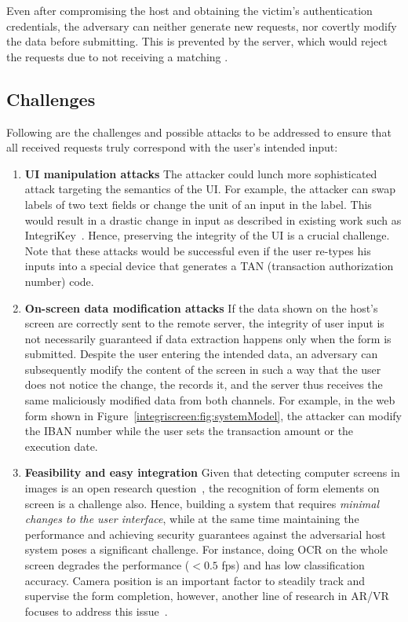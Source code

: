 Even after compromising the host and obtaining the victim's authentication credentials, the adversary can neither generate new requests, nor covertly modify the data before submitting. This is prevented by the server, which would reject the requests due to not receiving a matching \POI.


\subsection{Challenges}
\label{sec:systemDesign:challenger}

Following are the challenges and possible attacks to be addressed to ensure that all received requests truly correspond with the user's intended input:

\begin{enumerate}

\item \textbf{UI manipulation attacks}
The attacker could lunch more sophisticated attack targeting the semantics of the UI. For example, the attacker can swap labels of two text fields or change the unit of an input in the label. This would result in a drastic change in input as described in existing work such as IntegriKey~\cite{integrikey}. Hence, preserving the integrity of the UI is a crucial challenge. Note that these attacks would be successful even if the user re-types his inputs into a special device that generates a TAN (transaction authorization number) code.


\item \textbf{On-screen data modification attacks}
If the data shown on the host's screen are correctly sent to the remote server, the integrity of user input is not necessarily guaranteed if data extraction happens only when the form is submitted.
Despite the user entering the intended data, an adversary can subsequently modify the content of the screen in such a way that the user does not notice the change, the \app records it, and the server thus receives the same maliciously modified data from both channels. For example, in the web form shown in Figure~\ref{integriscreen:fig:systemModel}, the attacker can modify the IBAN number while the user sets the transaction amount or the execution date. 

 

\item \textbf{Feasibility and easy integration}
Given that detecting computer screens in images is an open research question~\cite{detectingScreens}, the recognition of form elements on screen is a challenge also. Hence, building a system that requires \emph{minimal changes to the user interface}, while at the same time maintaining the performance and achieving security guarantees against the adversarial host system poses a significant challenge. For instance, doing OCR on the whole screen degrades the performance ($<0.5$ fps) and has low classification accuracy. Camera position is an important factor to steadily track and supervise the form completion, however, another line of research in AR/VR focuses to address this issue~\cite{objectDetectionMobicom19, objectDetectionNIPS15, objectDetectionBD18}.


\end{enumerate}
